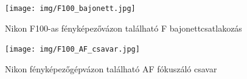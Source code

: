 \begin{figure}[H]
	\centering
	\texttt{[image: img/F100\_bajonett.jpg]}
	\caption{Nikon F100-as fényképezővázon található F bajonettcsatlakozás}
	\label{fig:F_bajonett}
\end{figure}

\begin{figure}[H]
	\centering
	\texttt{[image: img/F100\_AF\_csavar.jpg]}
	\caption{Nikon fényképezőgépvázon található AF fókuszáló csavar}
	\label{fig:F100_AF_csavar}
\end{figure}
